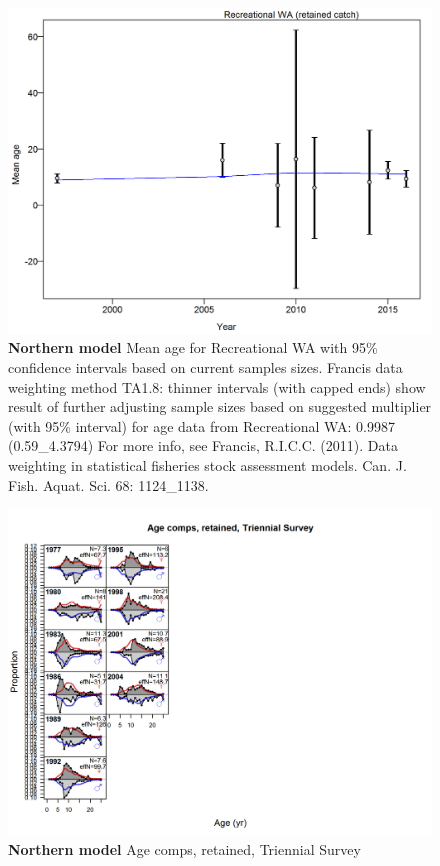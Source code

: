 \documentclass[12pt,]{article}
\begin{document}
\begin{figure}[htbp]
\centering
\includegraphics{./tex2pdf.8516/0fd525b5b80c46d4770d83e79eca4a11e52b3505.png}
\caption{\textbf{Northern model} Mean age for Recreational WA with 95\%
confidence intervals based on current samples sizes. Francis data
weighting method TA1.8: thinner intervals (with capped ends) show result
of further adjusting sample sizes based on suggested multiplier (with
95\% interval) for age data from Recreational WA: 0.9987 (0.59\_4.3794)
For more info, see Francis, R.I.C.C. (2011). Data weighting in
statistical fisheries stock assessment models. Can. J. Fish. Aquat. Sci.
68: 1124\_1138.
\label{fig:mod1_9_comp_agefit_data_weighting_TA1.8_Recreational WA}}
\end{figure}

\begin{figure}[htbp]
\centering
\includegraphics{./r4ss/plots_mod1/comp_agefit_flt5mkt2.png}
\caption{\textbf{Northern model} Age comps, retained, Triennial Survey
\label{fig:mod1_10_comp_agefit_flt5mkt2}}
\end{figure}
\end{document}
